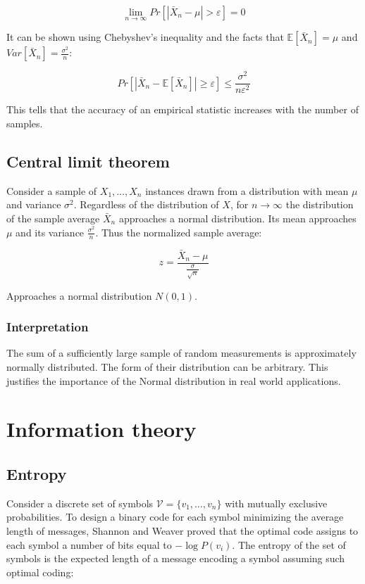 	$$\lim\limits_{n\rightarrow\infty} Pr[|\bar{X}_n-\mu| >\varepsilon] = 0$$

	It can be shown using Chebyshev's inequality and the facts that $\mathbb{E}[\bar{X}_n] = \mu$ and $Var[\bar{X}_n] = \frac{\sigma^2}{n}$:

	$$Pr[|\bar{X}_n - \mathbb{E}[\bar{X}_n]| \ge\varepsilon] \le \frac{\sigma^2}{n\varepsilon^2}$$

	This tells that the accuracy of an empirical statistic increases with the number of samples.

	\subsection{Central limit theorem}
	Consider a sample of $X_1, \dots, X_n$ instances drawn from a distribution with mean $\mu$ and variance $\sigma^2$.
	Regardless of the distribution of $X$, for $n\rightarrow\infty$ the distribution of the sample average $\bar{X}_n$ approaches a normal distribution.
	Its mean approaches $\mu$ and its variance $\frac{\sigma^2}{n}$.
	Thus the normalized sample average:

	$$z = \frac{\bar{X}_n-\mu}{\frac{\sigma}{\sqrt{n}}}$$

	Approaches a normal distribution $N(0,1)$.

		\subsubsection{Interpretation}
		The sum of a sufficiently large sample of random measurements is approximately normally distributed.
		The form of their distribution can be arbitrary.
		This justifies the importance of the Normal distribution in real world applications.

\section{Information theory}

	\subsection{Entropy}
	Consider a discrete set of symbols $\mathcal{V} = \{v_1, \dots, v_n\}$ with mutually exclusive probabilities.
	To design a binary code for each symbol minimizing the average length of messages, Shannon and Weaver proved that the optimal code assigns to each symbol a number of bits equal to $-\log P(v_i)$.
	The entropy of the set of symbols is the expected length of a message encoding a symbol assuming such optimal coding:

